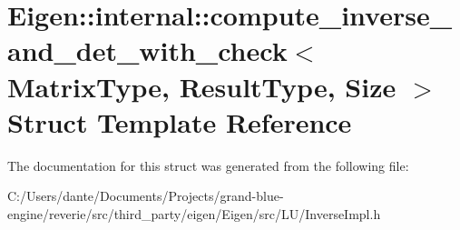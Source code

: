 \hypertarget{struct_eigen_1_1internal_1_1compute__inverse__and__det__with__check}{}\section{Eigen\+::internal\+::compute\+\_\+inverse\+\_\+and\+\_\+det\+\_\+with\+\_\+check$<$ Matrix\+Type, Result\+Type, Size $>$ Struct Template Reference}
\label{struct_eigen_1_1internal_1_1compute__inverse__and__det__with__check}


The documentation for this struct was generated from the following file\+:\begin{DoxyCompactItemize}
\item 
C\+:/\+Users/dante/\+Documents/\+Projects/grand-\/blue-\/engine/reverie/src/third\+\_\+party/eigen/\+Eigen/src/\+L\+U/Inverse\+Impl.\+h\end{DoxyCompactItemize}
